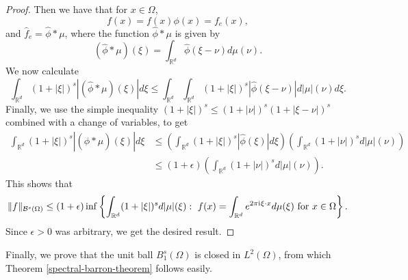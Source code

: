 \begin{proof}
 Then we have that for $x\in \Omega$,
 \begin{equation}
  f(x) = f(x)\phi(x) = f_e(x),
 \end{equation}
 and $\hat{f}_e = \hat{\phi} * \mu$,
 where the function $\hat{\phi} * \mu$ is given by
 \begin{equation}
  (\hat{\phi} * \mu)(\xi) = \int_{\mathbb{R}^d} \hat{\phi}(\xi - \nu)d\mu(\nu).
 \end{equation}
 We now calculate
 \begin{equation}
  \int_{\mathbb{R}^d}(1+|\xi|)^s|(\hat{\phi} * \mu)(\xi)|d\xi \leq \int_{\mathbb{R}^d}\int_{\mathbb{R}^d}(1+|\xi|)^s |\hat{\phi}(\xi - \nu)|d|\mu|(\nu)d\xi.
 \end{equation}
 Finally, we use the simple inequality $(1+|\xi|)^s \leq (1+|\nu|)^s(1+|\xi - \nu|)^s$ combined with a change of variables, to get
 \begin{equation}
 \begin{split}
 \int_{\mathbb{R}^d}(1+|\xi|)^s|(\hat{\phi} * \mu)(\xi)|d\xi &\leq \left(\int_{\mathbb{R}^d}(1+|\xi|)^s|\hat{\phi}(\xi)|d\xi\right)\left(\int_{\mathbb{R}^d}(1+|\nu|)^s d|\mu|(\nu)\right)\\
 &\leq (1+\epsilon)\left(\int_{\mathbb{R}^d}(1+|\nu|)^s d|\mu|(\nu)\right).
 \end{split}
 \end{equation}
 This shows that
 \begin{equation}
  \|f\|_{\mathcal{B}^s(\Omega)} \leq (1+\epsilon)\inf\left\{\int_{\mathbb{R}^d} (1+|\xi|)^sd|\mu|(\xi):~f(x)=\int_{\mathbb{R}^d} e^{2\pi {\mathrm{i}\mkern1mu}   \xi\cdot x}d\mu(\xi)~\text{for}~x\in\Omega\right\}.
 \end{equation}
 Since $\epsilon > 0$ was arbitrary, we get the desired result.
\end{proof}

Finally, we prove that the unit ball $B_1^s(\Omega)$ is closed in $L^2(\Omega)$, from which Theorem \ref{spectral-barron-theorem} follows easily.

